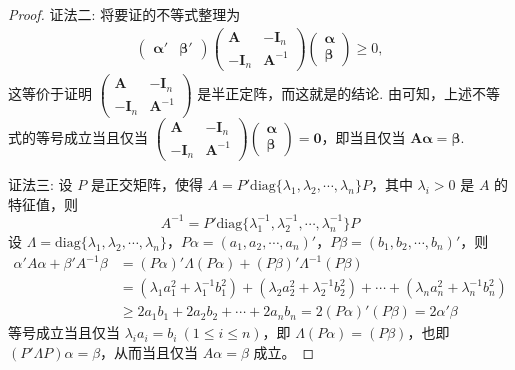 \documentclass[../../main.tex]{subfiles}
\begin{document}
\begin{proof}
{\color{blue}证法二:}
将要证的不等式整理为
\begin{align*}
\begin{pmatrix}
\boldsymbol{\alpha}' & \boldsymbol{\beta}'
\end{pmatrix}
\begin{pmatrix}
\boldsymbol{A} & -\boldsymbol{I}_n \\
-\boldsymbol{I}_n & \boldsymbol{A}^{-1}
\end{pmatrix}
\begin{pmatrix}
\boldsymbol{\alpha} \\
\boldsymbol{\beta}
\end{pmatrix} \geqslant  0,
\end{align*}
这等价于证明 $\begin{pmatrix}
\boldsymbol{A} & -\boldsymbol{I}_n \\
-\boldsymbol{I}_n & \boldsymbol{A}^{-1}
\end{pmatrix}$ 是半正定阵，而这就是的结论. 由可知，上述不等式的等号成立当且仅当 $\begin{pmatrix}
\boldsymbol{A} & -\boldsymbol{I}_n \\
-\boldsymbol{I}_n & \boldsymbol{A}^{-1}
\end{pmatrix}
\begin{pmatrix}
\boldsymbol{\alpha} \\
\boldsymbol{\beta}
\end{pmatrix}=\boldsymbol{0}$，即当且仅当 $\boldsymbol{A}\boldsymbol{\alpha}=\boldsymbol{\beta}$.

{\color{blue}证法三:}
设 \(P\) 是正交矩阵，使得 \(A = P'\mathrm{diag}\{\lambda_1,\lambda_2,\cdots,\lambda_n\}P\)，其中 \(\lambda_i > 0\) 是 \(A\) 的特征值，则
\[
A^{-1} = P'\mathrm{diag}\{\lambda_1^{-1},\lambda_2^{-1},\cdots,\lambda_n^{-1}\}P
\]
设 \(\Lambda = \mathrm{diag}\{\lambda_1,\lambda_2,\cdots,\lambda_n\}\)，\(P\alpha = (a_1,a_2,\cdots,a_n)'\)，\(P\beta = (b_1,b_2,\cdots,b_n)'\)，则
\begin{align*}
\alpha'A\alpha + \beta'A^{-1}\beta &= (P\alpha)'\Lambda(P\alpha) + (P\beta)'\Lambda^{-1}(P\beta)\\
&= (\lambda_1a_1^2 + \lambda_1^{-1}b_1^2) + (\lambda_2a_2^2 + \lambda_2^{-1}b_2^2) + \cdots + (\lambda_na_n^2 + \lambda_n^{-1}b_n^2)\\
&\geqslant  2a_1b_1 + 2a_2b_2 + \cdots + 2a_nb_n = 2(P\alpha)'(P\beta) = 2\alpha'\beta
\end{align*}
等号成立当且仅当 \(\lambda_ia_i = b_i\ (1\leqslant  i \leqslant  n)\)，即 \(\Lambda(P\alpha) = (P\beta)\)，也即 \((P'\Lambda P)\alpha = \beta\)，从而当且仅当 \(A\alpha = \beta\) 成立。 

\end{proof}
\end{document}
